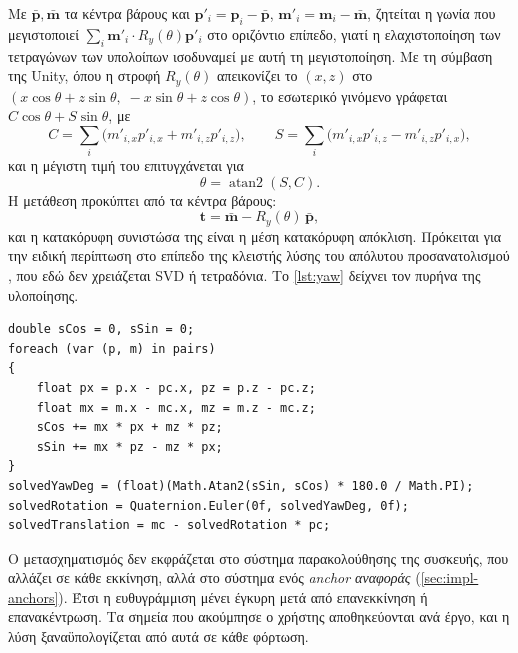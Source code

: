 Με $\bar{\mathbf{p}}, \bar{\mathbf{m}}$ τα κέντρα βάρους και $\mathbf{p}'_i = \mathbf{p}_i - \bar{\mathbf{p}}$, $\mathbf{m}'_i = \mathbf{m}_i - \bar{\mathbf{m}}$, ζητείται η γωνία που μεγιστοποιεί $\sum_i \mathbf{m}'_i \cdot R_y(\theta)\mathbf{p}'_i$ στο οριζόντιο επίπεδο, γιατί η ελαχιστοποίηση των τετραγώνων των υπολοίπων ισοδυναμεί με αυτή τη μεγιστοποίηση. Με τη σύμβαση της Unity, όπου η στροφή $R_y(\theta)$ απεικονίζει το $(x, z)$ στο $(x\cos\theta + z\sin\theta,\; -x\sin\theta + z\cos\theta)$, το εσωτερικό γινόμενο γράφεται $C\cos\theta + S\sin\theta$, με
\begin{equation}
  C = \sum_i \big(m'_{i,x} p'_{i,x} + m'_{i,z} p'_{i,z}\big), \qquad
  S = \sum_i \big(m'_{i,x} p'_{i,z} - m'_{i,z} p'_{i,x}\big),
\end{equation}
και η μέγιστη τιμή του επιτυγχάνεται για
\begin{equation}
  \theta = \operatorname{atan2}(S, C).
  \label{eq:yaw}
\end{equation}
Η μετάθεση προκύπτει από τα κέντρα βάρους:
\begin{equation}
  \mathbf{t} = \bar{\mathbf{m}} - R_y(\theta)\,\bar{\mathbf{p}} ,
  \label{eq:translation}
\end{equation}
και η κατακόρυφη συνιστώσα της είναι η μέση κατακόρυφη απόκλιση. Πρόκειται για την ειδική περίπτωση στο επίπεδο της κλειστής λύσης του απόλυτου προσανατολισμού \cite{horn1987closed,arun1987leastsquares}, που εδώ δεν χρειάζεται SVD ή τετραδόνια. Το \cref{lst:yaw} δείχνει τον πυρήνα της υλοποίησης.

\begin{lstlisting}[language={[Sharp]C},caption={Εκτίμηση της γωνίας (απόσπασμα από \texttt{ProjectAlignment.cs}).},label={lst:yaw}]
double sCos = 0, sSin = 0;
foreach (var (p, m) in pairs)
{
    float px = p.x - pc.x, pz = p.z - pc.z;
    float mx = m.x - mc.x, mz = m.z - mc.z;
    sCos += mx * px + mz * pz;
    sSin += mx * pz - mz * px;
}
solvedYawDeg = (float)(Math.Atan2(sSin, sCos) * 180.0 / Math.PI);
solvedRotation = Quaternion.Euler(0f, solvedYawDeg, 0f);
solvedTranslation = mc - solvedRotation * pc;
\end{lstlisting}

Ο μετασχηματισμός δεν εκφράζεται στο σύστημα παρακολούθησης της συσκευής, που αλλάζει σε κάθε εκκίνηση, αλλά στο σύστημα ενός \emph{anchor αναφοράς} (\cref{sec:impl-anchors}). Έτσι η ευθυγράμμιση μένει έγκυρη μετά από επανεκκίνηση ή επανακέντρωση. Τα σημεία που ακούμπησε ο χρήστης αποθηκεύονται ανά έργο, και η λύση ξαναϋπολογίζεται από αυτά σε κάθε φόρτωση.

